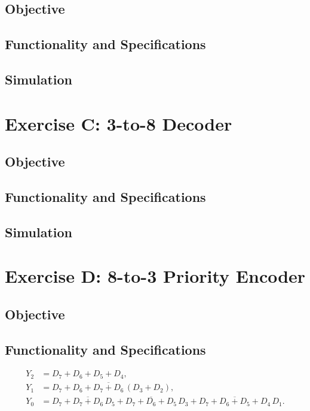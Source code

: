 \documentclass[12pt]{article}
\begin{document}
\subsection{Objective}

\subsection{Functionality and Specifications}

\subsection{Simulation}

\clearpage
\section{Exercise C: 3-to-8 Decoder}
\subsection{Objective}

\subsection{Functionality and Specifications}

\subsection{Simulation}

\clearpage
\section{Exercise D: 8-to-3 Priority Encoder}
\subsection{Objective}

\subsection{Functionality and Specifications}
\[
\begin{aligned}
Y_2 &= D_7 + D_6 + D_5 + D_4,\\[1mm]
Y_1 &= D_7 + D_6 + \overline{D_7 + D_6}\,(D_3 + D_2),\\[1mm]
Y_0 &= D_7 + \overline{D_7 + D_6}\,D_5 + \overline{D_7 + D_6 + D_5}\,D_3 + \overline{D_7 + D_6 + D_5 + D_4}\,D_1.
\end{aligned}
\]
\end{document}
